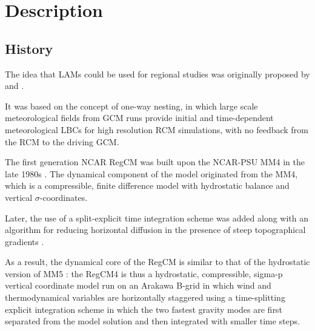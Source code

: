 
\chapter{Description}

\section{History}

The idea that \ac{LAMs} could be used for regional studies was originally
proposed by \citet{Dickinson_89} and \citet{Giorgi_90}.

It was based on the concept of one-way nesting, in which large scale
meteorological fields from \ac{GCM} runs provide initial and time-dependent
meteorological \ac{LBCs} for high resolution \ac{RCM} simulations, with no
feedback from the \ac{RCM} to the driving \ac{GCM}.

The first generation NCAR \ac{RegCM} was built upon the \ac{NCAR}-\ac{PSU}
\ac{MM4} in the late 1980s \citep{Dickinson_89, Giorgi_89}. The dynamical
component of the model originated from the \ac{MM4}, which is a compressible,
finite difference model with hydrostatic balance and vertical
$\sigma$-coordinates.

Later, the use of a split-explicit time integration scheme was added along
with an algorithm for reducing horizontal diffusion in the presence of steep
topographical gradients \citep{Giorgi_93,Giorgi_93b}.

As a result, the dynamical core of the \ac{RegCM} is similar to that of the
hydrostatic version of \ac{MM5} \citep{Grell_94}: the \ac{RegCM}4 is thus a
hydrostatic, compressible, sigma-p vertical coordinate model run on an
Arakawa B-grid in which wind and thermodynamical variables are horizontally
staggered using a time-splitting explicit integration scheme in which the two
fastest gravity modes are first separated from the model solution and then
integrated with smaller time steps.

